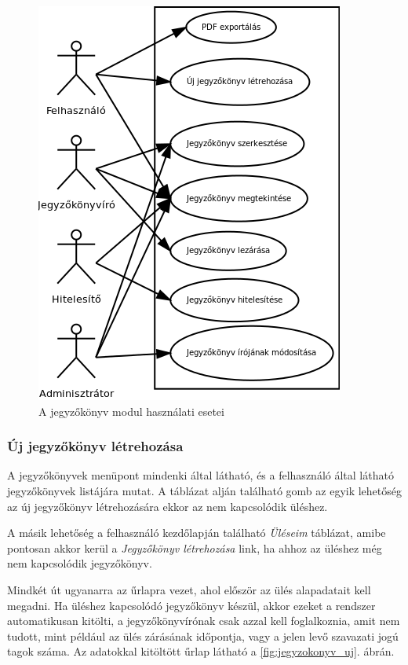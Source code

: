 \documentclass[a4paper,12pt,oneside]{report}
\begin{document}
\begin{figure}[h]
    \centering
        \includegraphics[width=.8\textwidth]{jegyzokonyv_usecase.png}
        \caption{A jegyzőkönyv modul használati esetei}
        \label{fig:jegyzokonyv_usecase}
\end{figure}

\subsubsection*{Új jegyzőkönyv létrehozása}

A jegyzőkönyvek menüpont mindenki által látható, és a felhasználó által látható jegyzőkönyvek listájára mutat. A táblázat alján található gomb az egyik lehetőség az új jegyzőkönyv létrehozására \textendash{} ekkor az nem kapcsolódik üléshez.

A másik lehetőség a felhasználó kezdőlapján található {\it Üléseim} táblázat, amibe pontosan akkor kerül a {\it Jegyzőkönyv létrehozása} link, ha ahhoz az üléshez még nem kapcsolódik jegyzőkönyv.

Mindkét út ugyanarra az űrlapra vezet, ahol először az ülés alapadatait kell megadni. Ha üléshez kapcsolódó jegyzőkönyv készül, akkor ezeket a rendszer automatikusan kitölti, a jegyzőkönyvírónak csak azzal kell foglalkoznia, amit nem tudott, mint például az ülés zárásának időpontja, vagy a jelen levő szavazati jogú tagok száma. Az adatokkal kitöltött űrlap látható a \ref{fig:jegyzokonyv_uj}. ábrán.
\end{document}
